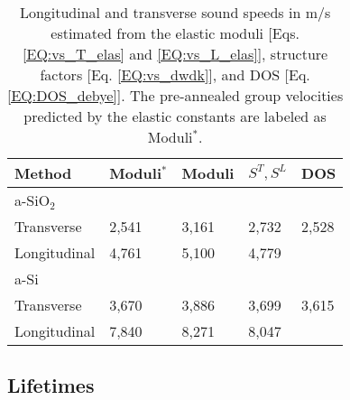 \begin{center}
\begingroup
\begin{table}
\caption{\label{T:vs}
Longitudinal and transverse sound speeds in m/s estimated from the 
elastic moduli [Eqs. \eqref{EQ:vs_T_elas} and \eqref{EQ:vs_L_elas}], 
structure factors [Eq. \eqref{EQ:vs_dwdk}], and 
DOS [Eq. \eqref{EQ:DOS_debye}]. The pre-annealed group velocities 
predicted by the elastic constants are labeled as Moduli$^*$.}
\begin{tabular}{lllll}
\hline \hline
Method & Moduli$^*$ & Moduli & $S^{T}, S^{L}$ & DOS \\
\hline
a-SiO$_2$ \\
\hline
Transverse & 2,541 & 3,161 & 2,732 & 2,528  \\
Longitudinal & 4,761 & 5,100 & 4,779 &  \\
\hline
a-Si \\
\hline
Transverse & 3,670 & 3,886 & 3,699 & 3,615 \\
Longitudinal & 7,840 & 8,271 & 8,047 & \\
\hline \hline
\end{tabular}
\end{table}
\endgroup
\end{center}
\vspace{10mm}

\subsection{\label{S:Life}Lifetimes}

